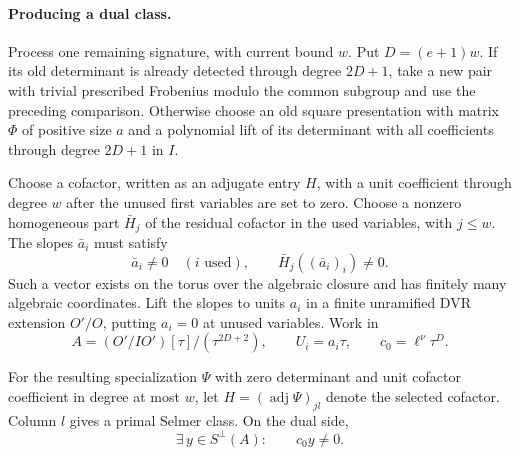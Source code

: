 \paragraph{Producing a dual class.}
Process one remaining signature, with current bound \(w\).
Put \(D=(e+1)w\). If its old determinant is already detected
through degree \(2D+1\), take a new pair with trivial prescribed
Frobenius modulo the common subgroup and use the preceding
comparison. Otherwise choose an old square presentation with
matrix \(\Phi\) of positive size \(a\) and a polynomial lift
of its determinant with all coefficients through degree
\(2D+1\) in \(I\).

Choose a cofactor, written as an adjugate
entry \(H\), with a unit coefficient through degree \(w\)
after the unused first variables are set to zero. Choose a nonzero homogeneous part \(\bar H_j\) of the residual cofactor in the used variables, with \(j\le w\). The slopes \(\bar a_i\) must satisfy
\[
 \bar a_i\ne0\quad (i\text{ used}),\qquad \bar H_j((\bar a_i)_i)\ne0.
\]
Such a vector exists on the torus over
the algebraic closure and has finitely many algebraic coordinates.
Lift the slopes to units \(a_i\) in a finite unramified DVR
extension \(O'/O\), putting \(a_i=0\) at unused variables.
Work in
\[
          A=(O'/I O')[\tau]/(\tau^{2D+2}),\qquad
          U_i=a_i \tau,\qquad c_0=\ell^\nu \tau^D .
\]
\begin{lemma}
For the resulting specialization \(\Psi\) with zero determinant
and unit cofactor coefficient in degree at most \(w\), let
\(H=(\operatorname{adj}\Psi)_{jl}\) denote the selected cofactor.
Column \(l\) gives a primal Selmer class. On the dual side,
\[
 \exists\,y\in S^\perp(A):\qquad c_0y\ne0.
\]
\end{lemma}
